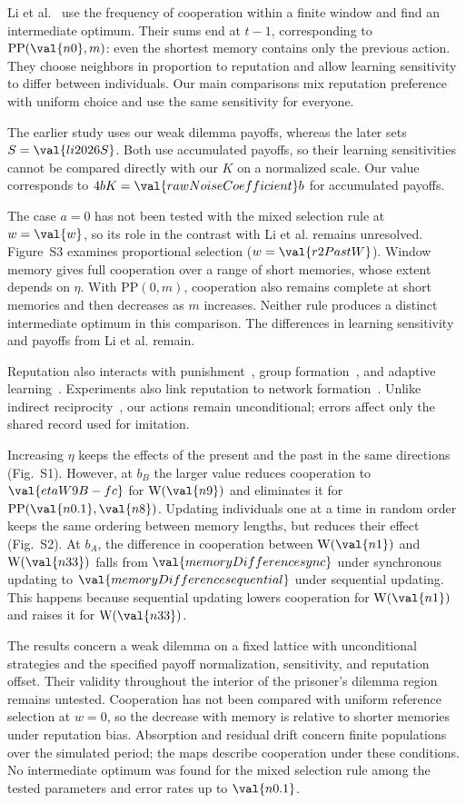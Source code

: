 \documentclass[physics,article,submit,moreauthors]{Definitions/mdpi}
\newcommand{\W}{\mathrm{W}}
\newcommand{\PP}{\mathrm{PP}}
\begin{document}
Li et al.~\cite{li2025,li2026} use the frequency of cooperation within a finite window and find an intermediate optimum. Their sums end at $t-1$, corresponding to $\PP(\val{n0},m)$: even the shortest memory contains only the previous action. They choose neighbors in proportion to reputation and allow learning sensitivity to differ between individuals. Our main comparisons mix reputation preference with uniform choice and use the same sensitivity for everyone.

The earlier study uses our weak dilemma payoffs, whereas the later sets $S=\val{li2026S}$. Both use accumulated payoffs, so their learning sensitivities cannot be compared directly with our $K$ on a normalized scale. Our value corresponds to $4bK=\val{rawNoiseCoefficient}b$ for accumulated payoffs.

The case $a=0$ has not been tested with the mixed selection rule at $w=\val{w}$, so its role in the contrast with Li et al. remains unresolved. Figure~S3 examines proportional selection ($w=\val{r2PastW}$). Window memory gives full cooperation over a range of short memories, whose extent depends on $\eta$. With $\PP(0,m)$, cooperation also remains complete at short memories and then decreases as $m$ increases. Neither rule produces a distinct intermediate optimum in this comparison. The differences in learning sensitivity and payoffs from Li et al. remain.

Reputation also interacts with punishment~\cite{brandt2003}, group formation~\cite{yang2018preprint}, and adaptive learning~\cite{li2025,li2026}. Experiments also link reputation to network formation~\cite{cuesta2015}. Unlike indirect reciprocity~\cite{sasaki2017}, our actions remain unconditional; errors affect only the shared record used for imitation.

Increasing $\eta$ keeps the effects of the present and the past in the same directions (Fig.~S1). However, at $b_B$ the larger value reduces cooperation to $\val{etaW9B-fc}$ for $\W(\val{n9})$ and eliminates it for $\PP(\val{n0.1},\val{n8})$. Updating individuals one at a time in random order keeps the same ordering between memory lengths, but reduces their effect (Fig.~S2). At $b_A$, the difference in cooperation between $\W(\val{n1})$ and $\W(\val{n33})$ falls from $\val{memoryDifferencesync}$ under synchronous updating to $\val{memoryDifferencesequential}$ under sequential updating. This happens because sequential updating lowers cooperation for $\W(\val{n1})$ and raises it for $\W(\val{n33})$.

The results concern a weak dilemma on a fixed lattice with unconditional strategies and the specified payoff normalization, sensitivity, and reputation offset. Their validity throughout the interior of the prisoner's dilemma region remains untested. Cooperation has not been compared with uniform reference selection at $w=0$, so the decrease with memory is relative to shorter memories under reputation bias. Absorption and residual drift concern finite populations over the simulated period; the maps describe cooperation under these conditions. No intermediate optimum was found for the mixed selection rule among the tested parameters and error rates up to $\val{n0.1}$.
\end{document}
